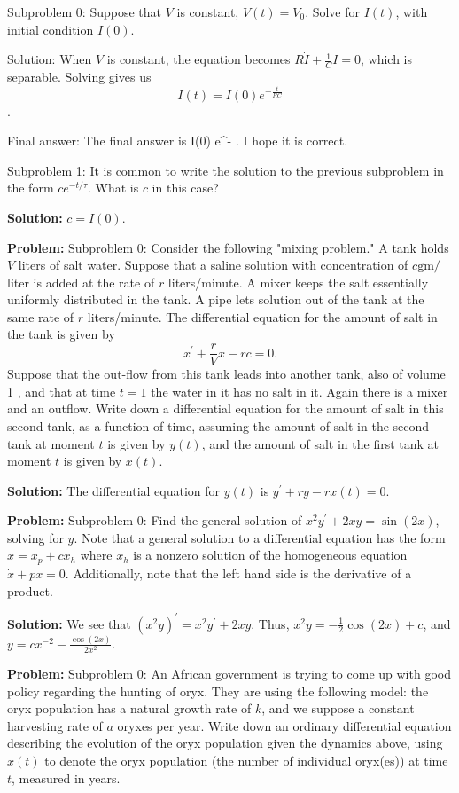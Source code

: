 \documentclass[10pt]{article}
\begin{document}
Subproblem 0: Suppose that $V$ is constant, $V(t)=V_{0}$. Solve for $I(t)$, with initial condition $I(0)$.


Solution: When $V$ is constant, the equation becomes $R \dot{I}+\frac{1}{C} I=0$, which is separable. Solving gives us
\[
I(t)=\boxed{I(0) e^{-\frac{t}{R C}}
}\]. 

Final answer: The final answer is I(0) e^{-}
. I hope it is correct.

Subproblem 1: It is common to write the solution to the previous subproblem in the form $c e^{-t / \tau}$. What is $c$ in this case?


\textbf{Solution:}
$c=\boxed{I(0)}$.


\textbf{Problem:}
Subproblem 0: Consider the following "mixing problem." A tank holds $V$ liters of salt water. Suppose that a saline solution with concentration of $c \mathrm{gm} /$ liter is added at the rate of $r$ liters/minute. A mixer keeps the salt essentially uniformly distributed in the tank. A pipe lets solution out of the tank at the same rate of $r$ liters/minute. The differential equation for the amount of salt in the tank is given by 
\[
x^{\prime}+\frac{r}{V} x-r c=0 .
\]
Suppose that the out-flow from this tank leads into another tank, also of volume 1 , and that at time $t=1$ the water in it has no salt in it. Again there is a mixer and an outflow. Write down a differential equation for the amount of salt in this second tank, as a function of time, assuming the amount of salt in the second tank at moment $t$ is given by $y(t)$, and the amount of salt in the first tank at moment $t$ is given by $x(t)$. 


\textbf{Solution:}
The differential equation for $y(t)$ is $\boxed{y^{\prime}+r y-r x(t)=0}$.


\textbf{Problem:}
Subproblem 0: Find the general solution of $x^{2} y^{\prime}+2 x y=\sin (2 x)$, solving for $y$. Note that a general solution to a differential equation has the form $x=x_{p}+c x_{h}$ where $x_{h}$ is a nonzero solution of the homogeneous equation $\dot{x}+p x=0$. Additionally, note that the left hand side is the derivative of a product.


\textbf{Solution:}
We see that $\left(x^{2} y\right)^{\prime}=x^{2} y^{\prime}+2 x y$. Thus, $x^{2} y=-\frac{1}{2} \cos (2 x)+c$, and $y=\boxed{c x^{-2}-\frac{\cos (2 x)}{2 x^{2}}}$.


\textbf{Problem:}
Subproblem 0: An African government is trying to come up with good policy regarding the hunting of oryx. They are using the following model: the oryx population has a natural growth rate of $k$, and we suppose a constant harvesting rate of $a$ oryxes per year.
Write down an ordinary differential equation describing the evolution of the oryx population given the dynamics above, using $x(t)$ to denote the oryx population (the number of individual oryx(es)) at time $t$, measured in years.
\end{document}

